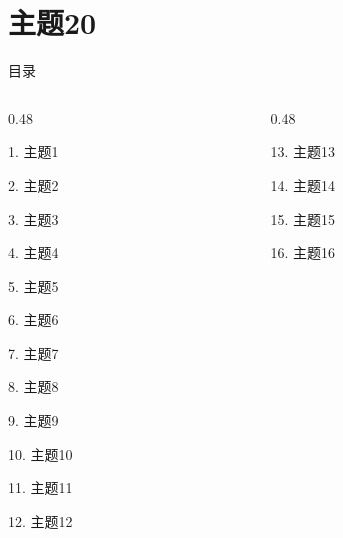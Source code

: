 \documentclass[aspectratio=169,10pt,fontset=fandol]{ctexbeamer}
\begin{document}
\section{主题20}
\begin{frame}[t,fragile]{目录}
\small
\begin{columns}[T,onlytextwidth]
\begin{column}{0.48\textwidth}
{\color{black}\small 1. 主题1\par}\vspace{0.22em}
{\color{black}\small 2. 主题2\par}\vspace{0.22em}
{\color{black}\small 3. 主题3\par}\vspace{0.22em}
{\color{black}\small 4. 主题4\par}\vspace{0.22em}
{\color{black}\small 5. 主题5\par}\vspace{0.22em}
{\color{black}\small 6. 主题6\par}\vspace{0.22em}
{\color{black}\small 7. 主题7\par}\vspace{0.22em}
{\color{black}\small 8. 主题8\par}\vspace{0.22em}
{\color{black}\small 9. 主题9\par}\vspace{0.22em}
{\color{black}\small 10. 主题10\par}\vspace{0.22em}
{\color{black}\small 11. 主题11\par}\vspace{0.22em}
{\color{black}\small 12. 主题12\par}\vspace{0.22em}
\end{column}
\begin{column}{0.48\textwidth}
{\color{black}\small 13. 主题13\par}\vspace{0.22em}
{\color{black}\small 14. 主题14\par}\vspace{0.22em}
{\color{black}\small 15. 主题15\par}\vspace{0.22em}
{\color{black}\small 16. 主题16\par}\vspace{0.22em}

\end{column}
\end{columns}
\end{frame}
\end{document}
